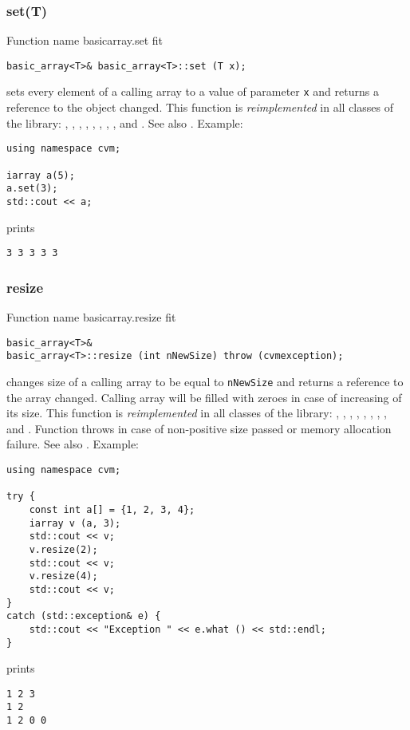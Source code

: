 \subsubsection{set(T)}
Function%
\pdfdest name {basicarray.set} fit
\begin{verbatim}
basic_array<T>& basic_array<T>::set (T x);
\end{verbatim}
sets every element of a calling array to a value of
parameter \verb"x"
and returns a reference to the object changed.
This function is \emph{reimplemented} in all classes of the library:
,  ,
,   ,
, ,
, ,
 and .
See also .
Example:
\begin{Verbatim}
using namespace cvm;

iarray a(5);
a.set(3);
std::cout << a;
\end{Verbatim}
prints
\begin{Verbatim}
3 3 3 3 3
\end{Verbatim}
\newpage


\subsubsection{resize}
Function%
\pdfdest name {basicarray.resize} fit
\begin{verbatim}
basic_array<T>&
basic_array<T>::resize (int nNewSize) throw (cvmexception);
\end{verbatim}
changes  size of a calling array to be equal to
\verb"nNewSize" and returns a reference to
the array changed. Calling array
will be filled with zeroes in case of increasing of its size.
This function is \emph{reimplemented} in all classes of the library:
,  ,
,   ,
, ,
, ,
 and .
Function throws 
in case of non-positive size passed or memory allocation failure.
See also .
Example:
\begin{Verbatim}
using namespace cvm;

try {
    const int a[] = {1, 2, 3, 4};
    iarray v (a, 3);
    std::cout << v;
    v.resize(2);
    std::cout << v;
    v.resize(4);
    std::cout << v;
}
catch (std::exception& e) {
    std::cout << "Exception " << e.what () << std::endl;
}
\end{Verbatim}
prints
\begin{Verbatim}
1 2 3
1 2
1 2 0 0
\end{Verbatim}
\newpage



